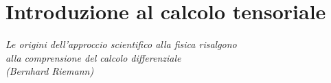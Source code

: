 \chapter{Introduzione al calcolo tensoriale}
\vspace{-1.0cm}
\begin{flushright}
\textit{
 Le origini dell'approccio scientifico alla fisica risalgono \\alla comprensione del calcolo differenziale \\
(Bernhard Riemann)
}
\end{flushright}
\vspace{+1.0cm}
\minitoc
% 
% 








%










